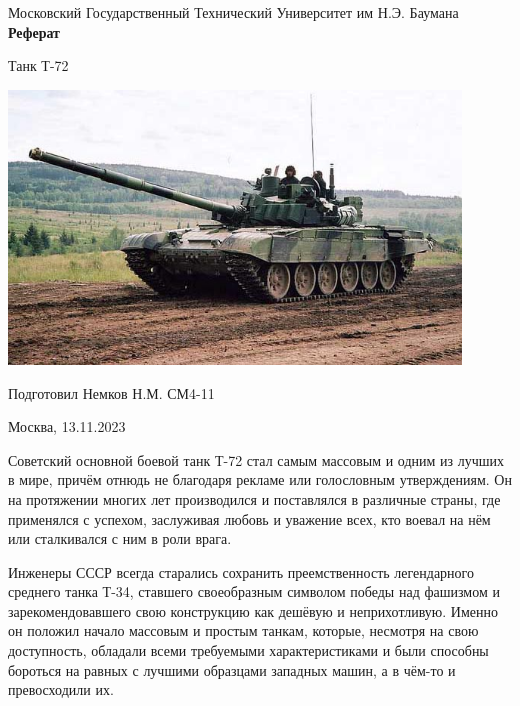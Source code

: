 




\begin{center}
	\Large{Московский Государственный Технический Университет им Н.Э. Баумана}
	\Huge{\textbf{Реферат}}

	Танк Т-72


	\includegraphics[width=0.9\textwidth]{images/tank1.jpg}

\end{center}
\mbox{}
\vfill
Подготовил Немков Н.М. СМ4-11
\begin{center}
Москва, 13.11.2023
\end{center}
\newpage
\tableofcontents

\newpage

Советский основной боевой танк Т-72 стал самым массовым и одним из лучших в мире, причём отнюдь не благодаря рекламе или голословным утверждениям. Он на протяжении многих лет производился и поставлялся в различные страны, где применялся с успехом, заслуживая любовь и уважение всех, кто воевал на нём или сталкивался с ним в роли врага.

Инженеры СССР всегда старались сохранить преемственность легендарного среднего танка Т-34, ставшего своеобразным символом победы над фашизмом и зарекомендовавшего свою конструкцию как дешёвую и неприхотливую. Именно он положил начало массовым и простым танкам, которые, несмотря на свою доступность, обладали всеми требуемыми характеристиками и были способны бороться на равных с лучшими образцами западных машин, а в чём-то и превосходили их.

